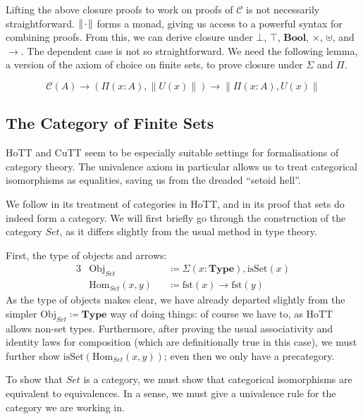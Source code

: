 Lifting the above closure proofs to work on proofs of \(\mathcal{C}\) is not
necessarily straightforward.
\(\lVert {\mkern 2mu\cdot\mkern 2mu} \rVert\) forms a monad, giving us access to a powerful syntax for
combining proofs.
From this, we can derive closure under \(\bot\), \(\top\), \(\mathbf{Bool}\),
\(\times\), \(\uplus\), and \(\rightarrow\).
The dependent case is not so straightforward.
We need the following lemma, a version of the axiom of choice on finite sets,
to prove closure under \(\Sigma\) and \(\Pi\).
\begin{lemma}
  \begin{equation}
    \mathcal{C}(A) \rightarrow (\Pi(x : A) , \lVert U(x) \rVert) \rightarrow \lVert \Pi(x : A) , U(x) \rVert
  \end{equation}
\end{lemma}
\subsection{The Category of Finite Sets}
HoTT and CuTT seem to be especially suitable settings for formalisations of
category theory.
The univalence axiom in particular allows us to treat categorical isomorphisms
as equalities, saving us from the dreaded ``setoid hell''.

We follow \cite[chapter 9]{hottbook} in its treatment of
categories in HoTT, and in its proof that sets do indeed form a category.
We will first briefly go through the construction of the category
\(\mathit{Set}\), as it differs slightly from the usual method in type theory.

First, the type of objects and arrows:
\begin{alignat}{3}
  &\text{Obj}_\mathit{Set}      &&\coloneqq \Sigma(x : \mathbf{Type}) , \text{isSet}(x) \\
  &\text{Hom}_\mathit{Set}(x , y) &&\coloneqq  \text{fst}(x) \rightarrow \text{fst}(y)
\end{alignat}
As the type of objects makes clear, we have already departed slightly from the
simpler \(\text{Obj}_\mathit{Set} \coloneqq \mathbf{Type}\) way of doing things:
of course we have to, as HoTT allows non-set types.
Furthermore, after proving the usual associativity and identity laws for
composition (which are definitionally true in this case), we must further show
\(\text{isSet}(\text{Hom}_\mathit{Set}(x,y))\); even then we only have a
precategory.

To show that \(\mathit{Set}\) is a category, we must show that categorical
isomorphisms are equivalent to equivalences.
In a sense, we must give a univalence rule for the category we are working in.

